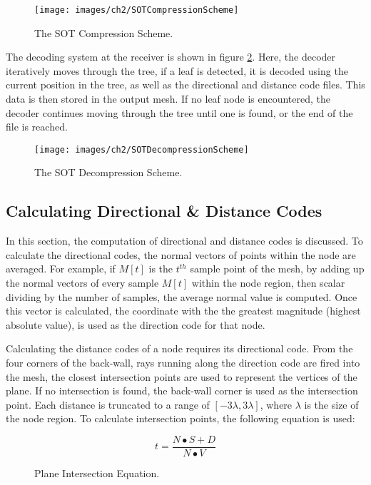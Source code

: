 \begin{figure}[!h]
\centering
\texttt{[image: images/ch2/SOTCompressionScheme]}
\caption{The SOT Compression Scheme.}
\label{SOTCompressionScheme}
\end{figure}

The decoding system at the receiver is shown in figure \ref{SOTDecompressionScheme}. Here, the decoder iteratively moves through the tree, if a leaf is detected, it is decoded using the current position in the tree, as well as the directional and distance code files. This data is then stored in the output mesh. If no leaf node is encountered, the decoder continues moving through the tree until one is found, or the end of the file is reached.

\begin{figure}[!h]
\centering
\texttt{[image: images/ch2/SOTDecompressionScheme]}
\caption{The SOT Decompression Scheme.}
\label{SOTDecompressionScheme}
\end{figure}

\subsection{Calculating Directional \& Distance Codes}

In this section, the computation of directional and distance codes is discussed. To calculate the directional codes, the normal vectors of points within the node are averaged. For example, if $M[t]$ is the $t^{th}$ sample point of the mesh, by adding up the normal vectors of every sample $M[t]$ within the node region, then scalar dividing by the number of samples, the average normal value is computed. Once this vector is calculated, the coordinate with the the greatest magnitude (highest absolute value), is used as the direction code for that node.

Calculating the distance codes of a node requires its directional code. From the four corners of the back-wall, rays running along the direction code are fired into the mesh, the closest intersection points are used to represent the vertices of the plane. If no intersection is found, the back-wall corner is used as the intersection point. Each distance is truncated to a range of $[-3\lambda, 3\lambda]$, where $\lambda$ is the size of the node region. To calculate intersection points, the following equation is used:

\begin{figure}[!h]
\label{RayPlaneIntersection}
$$
t = \frac{N \bullet S + D}{N \bullet V}
$$
\caption{Plane Intersection Equation.}
\end{figure}

